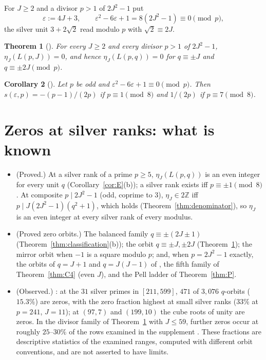 \documentclass[11pt]{article}
\newtheorem{theorem}{Theorem}[section]
\newtheorem{corollary}[theorem]{Corollary}
\theoremstyle{definition}
\newcommand{\Z}{\mathbb Z}
\begin{document}
For $J\geq2$ and a divisor $p>1$ of $2J^2-1$ put
\begin{equation}
 \varepsilon:=4J+3,\qquad \varepsilon^2-6\varepsilon+1=8(2J^2-1)\equiv0\pmod p,
 \label{eq:silver-unit}
\end{equation}
the silver unit $3+2\sqrt2$ read modulo $p$ with $\sqrt2\equiv2J$.

\begin{theorem}[{\cite[Thm.~7.1]{LensChirality2026}}]
\label{thm:C3}
For every $J\geq2$ and every divisor $p>1$ of $2J^2-1$,
$\eta_J(L(p,J))=0$, and hence $\eta_J(L(p,q))=0$ for $q\equiv\pm J$ and
$q\equiv\pm2J\pmod p$.
\end{theorem}

\begin{corollary}[{\cite[Cor.~7.11]{LensChirality2026}}]
\label{cor:S}
Let $p$ be odd and $\varepsilon^2-6\varepsilon+1\equiv0\pmod p$.  Then
$s(\varepsilon,p)=-(p-1)/(2p)$ if $p\equiv1\pmod8$ and $1/(2p)$ if
$p\equiv7\pmod8$.
\end{corollary}

\section{Zeros at silver ranks: what is known}
\label{sec:overview}

\begin{itemize}
\item \textup{(Proved.)}  At a silver rank of a prime $p\geq5$, $\eta_J(L(p,q))$ is an
even integer for every unit $q$ (Corollary~\ref{cor:E}(b)); a silver rank
exists iff $p\equiv\pm1\pmod8$.  At composite $p\mid2J^2-1$ (odd, coprime
to $3$), $\eta_J\in2\Z$ iff $p\mid J(2J^2-1)(q^2+1)$, which holds
(Theorem~\ref{thm:denominator}), so $\eta_J$ is an even integer at
every silver rank of every modulus.
\item \textup{(Proved zero orbits.)}  The balanced family
$q\equiv\pm(2J\pm1)$ (Theorem~\ref{thm:classification}(b)); the orbit
$q\equiv\pm J,\pm2J$ (Theorem~\ref{thm:C3}); the mirror orbit when
$-1$ is a square modulo $p$; and, when $p=2J^2-1$ exactly, the orbits of
$q=J+1$ and $q=J(J-1)$ of \cite[Thm.~7.1]{MahmoodP1Collection2026}, the
fifth family of Theorem~\ref{thm:C4} (even $J$), and the Pell ladder of
Theorem~\ref{thm:P}.
\item \textup{(Observed.)}  \cite[Obs.~5.5 and 5.6]{LensChirality2026}: at the $31$ silver primes in $[211,599]$,
$471$ of $3{,}076$ $q$-orbits ($15.3\%$) are zeros, with the zero fraction
highest at small silver ranks ($33\%$ at $p=241$, $J=11$); at
$(97,7)$ and $(199,10)$ the cube roots of unity are zeros.  In the
divisor family of Theorem~\ref{thm:C3} with $J\leq59$, further zeros
occur at roughly $25$--$30\%$ of the rows examined in the supplement
\cite{LCrecord}.  These fractions are
descriptive statistics of the examined ranges, computed with different
orbit conventions, and are not asserted to have limits.
\end{itemize}
\end{document}
